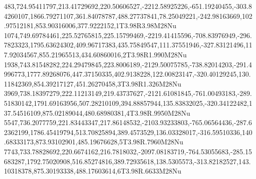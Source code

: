 483,724.95411797,213.41729692,220.50606527,-2212.58925226,-651.19240455,-303.84260107,1866.79271107,361.84078787,488.27737841,78.25049221,-242.98163669,102.97512181,853.90316006,377.9222152,1T3.98R3.98M28Nu
1074,749.69784461,225.52765815,225.15799469,-2219.41415596,-708.83976949,-296.7823323,1795.63624302,409.96717383,435.75849547,111.37551946,-327.83121496,117.92034567,855.21965513,434.60860016,2T3.98R1.990M28Nu
1938,743.81548282,224.29479845,223.8006189,-2129.50075785,-738.82014203,-291.4996773,1777.89268076,447.37150335,402.9138228,122.00823147,-320.40129245,130.11842369,854.39217127,451.26270458,3T3.98R1.326M28Nu
3969,738.18397279,222.11213149,219.43737627,-2121.61081845,-761.00493183,-289.51830142,1791.69163956,507.28210109,394.88857944,135.83832025,-320.34122482,137.54516109,875.02189044,480.68980381,4T3.98R.9950M28Nu
5547,736.2077759,221.83443347,217.86148532,-2103.93233803,-765.06564436,-287.62362199,1786.45419794,513.70825894,389.4573529,136.03328017,-316.59510336,140.68333173,873.93102901,485.19676628,5T3.98R.7960M28Nu
7743,733.78828692,220.6674162,216.7818032,-2097.08183719,-764.53055683,-285.15683287,1792.75020908,516.85274816,389.72935618,138.5305573,-313.82182527,143.10318378,875.30193338,488.17603614,6T3.98R.6633M28Nu
